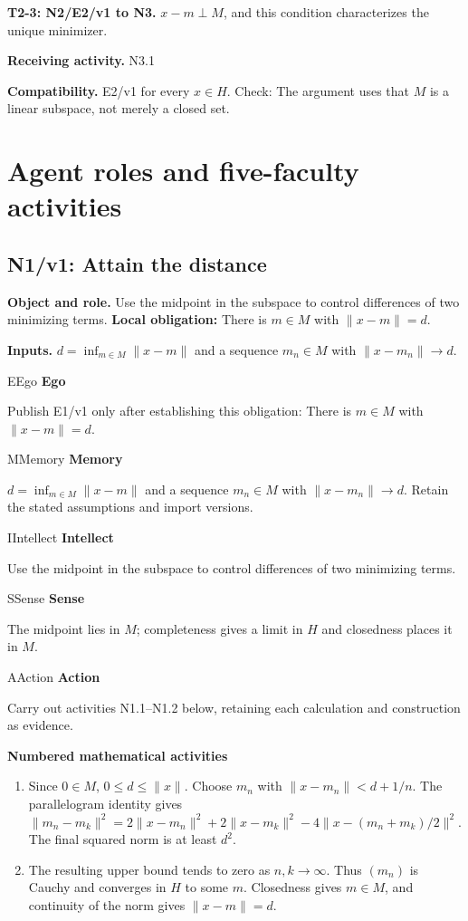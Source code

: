 \documentclass[preprint,12pt,aps,pra,showkeys,amsmath,amssymb,superscriptaddress,floatfix]{revtex4-2}
\theoremstyle{definition}
\theoremstyle{remark}
\newcommand{\mmfaculty}[3]{%
 \begin{mmfacultybox}{#1}{#2}
 {\sffamily\bfseries\color{MMBlue}#2}\par\smallskip #3
 \end{mmfacultybox}}
\newcommand{\field}[2]{\par\smallskip\noindent\textbf{#1.} #2\par}
\begin{document}
\field{T2-3: N2/E2/v1 to N3}{\(x-m\perp M\), and this condition characterizes the unique minimizer.}

\field{Receiving activity}{N3.1}

\field{Compatibility}{E2/v1 for every \(x\in H\). Check: The argument uses that \(M\) is a
linear subspace, not merely a closed set.}

\endgroup

\clearpage\section{Agent roles and five-faculty activities}\begingroup\small\linespread{1.05}\selectfont{}

\subsection{N1/v1: Attain the distance}

\field{Object and role}{Use the midpoint in the subspace to control differences of two
minimizing terms. \textbf{Local obligation:} There is \(m\in M\) with
\(\|x-m\|=d\).}

\field{Inputs}{\(d=\inf_{m\in M}\|x-m\|\) and a sequence \(m_n\in M\) with
\(\|x-m_n\|\to d\).}

\mmfaculty{E}{Ego}{Publish E1/v1 only after establishing this obligation: There is
\(m\in M\) with \(\|x-m\|=d\).}

\mmfaculty{M}{Memory}{\(d=\inf_{m\in M}\|x-m\|\) and a sequence \(m_n\in M\) with
\(\|x-m_n\|\to d\). Retain the stated assumptions and import versions.}

\mmfaculty{I}{Intellect}{Use the midpoint in the subspace to control differences of two
minimizing terms.}

\mmfaculty{S}{Sense}{The midpoint lies in \(M\); completeness gives a limit in \(H\) and
closedness places it in \(M\).}

\mmfaculty{A}{Action}{Carry out activities N1.1--N1.2 below, retaining each calculation and
construction as evidence.}

\smallskip\noindent\textbf{Numbered mathematical activities}

\begin{enumerate}[label=N1.\arabic*,leftmargin=3.4em]

\item Since \(0\in M\), \(0\le d\le\|x\|\). Choose \(m_n\) with
\(\|x-m_n\|<d+1/n\). The parallelogram identity gives
\(\|m_n-m_k\|^2=2\|x-m_n\|^2+2\|x-m_k\|^2-4\|x-(m_n+m_k)/2\|^2\). The
final squared norm is at least \(d^2\).

\item The resulting upper bound tends to zero as \(n,k\to\infty\). Thus
\((m_n)\) is Cauchy and converges in \(H\) to some \(m\). Closedness
gives \(m\in M\), and continuity of the norm gives \(\|x-m\|=d\).

\end{enumerate}
\end{document}
